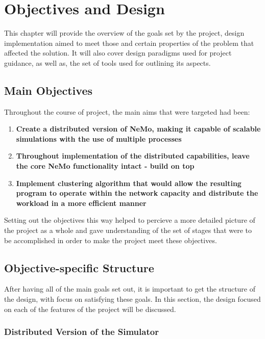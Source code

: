 \chapter{Objectives and Design}

This chapter will provide the overview of the goals set by the project, design implementation aimed to meet those and certain properties of the problem that affected the solution.
It will also cover design paradigms used for project guidance, as well as, the set of tools used for outlining its aspects.

\section{Main Objectives}

Throughout the course of project, the main aims that were targeted had been:

\begin{enumerate}
\item {\textbf{Create a distributed version of NeMo, making it capable of scalable simulations with the use of multiple processes}}
\item {\textbf{Throughout implementation of the distributed capabilities, leave the core NeMo functionality intact - build on top}}
\item {\textbf{Implement clustering algorithm that would allow the resulting program to operate within the network capacity and distribute the workload in a more efficient manner}}
\end{enumerate}

Setting out the objectives this way helped to percieve a more detailed picture of the project as a whole and gave understanding of the set of stages that were to be accomplished in order to
make the project meet these objectives.

\section{Objective-specific Structure}

After having all of the main goals set out, it is important to get the structure of the design, with focus on satisfying these goals. In this section, the design focused on each of the features of the project will be discussed.

\subsection{Distributed Version of the Simulator}

